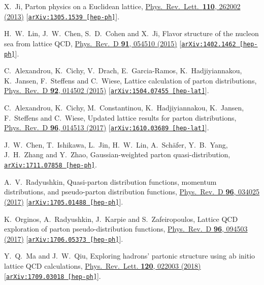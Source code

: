 \documentclass[aps,prl,reprint,groupedaddress, preprintnumbers]{revtex4-1}
\begin{document}
\begin{thebibliography}{50}
  
  X.~Ji,
  Parton physics on a Euclidean lattice,
  \href{https://doi.org/10.1103/PhysRevLett.110.262002}{Phys.\ Rev.\ Lett.\  {\bf 110}, 262002 (2013)}
  [\href{https://arxiv.org/abs/1305.1539}{\tt arXiv:1305.1539 [hep-ph]}].
  
  
  H.~W.~Lin, J.~W.~Chen, S.~D.~Cohen and X.~Ji,
  Flavor structure of the nucleon sea from lattice QCD,
  \href{https://doi.org/10.1103/PhysRevD.91.054510}{Phys.\ Rev.\ D {\bf 91}, 054510 (2015)}
  [\href{https://arxiv.org/abs/1402.1462}{\tt arXiv:1402.1462 [hep-ph]}].
  
  
  C.~Alexandrou, K.~Cichy, V.~Drach, E.~Garcia-Ramos, K.~Hadjiyiannakou, K.~Jansen, F.~Steffens and C.~Wiese,
  Lattice calculation of parton distributions,
  \href{https://doi.org/10.1103/PhysRevD.92.014502}{Phys.\ Rev.\ D {\bf 92}, 014502 (2015)}
  [\href{https://arxiv.org/abs/1504.07455}{\tt arXiv:1504.07455 [hep-lat]}].
  
  
  C.~Alexandrou, K.~Cichy, M.~Constantinou, K.~Hadjiyiannakou, K.~Jansen, F.~Steffens and C.~Wiese,
  Updated lattice results for parton distributions,
  \href{https://doi.org/10.1103/PhysRevD.96.014513}{Phys.\ Rev.\ D {\bf 96}, 014513 (2017)}
  [\href{https://arxiv.org/abs/1610.03689}{\tt arXiv:1610.03689 [hep-lat]}].
  

  J.~W.~Chen, T.~Ishikawa, L.~Jin, H.~W.~Lin, A.~Sch\"afer, Y.~B.~Yang, J.~H.~Zhang and Y.~Zhao,
  Gaussian-weighted parton quasi-distribution,
  \href{https://arxiv.org/abs/1711.07858}{\tt arXiv:1711.07858 [hep-ph]}.
  
 
  A.~V.~Radyushkin,
  Quasi-parton distribution functions, momentum distributions, and pseudo-parton distribution functions,
  \href{https://doi.org/10.1103/PhysRevD.96.034025}{Phys.\ Rev.\ D {\bf 96},  034025 (2017)}
  [\href{https://arxiv.org/abs/1705.01488}{\tt arXiv:1705.01488 [hep-ph]}].
  
  
  K.~Orginos, A.~Radyushkin, J.~Karpie and S.~Zafeiropoulos,
  Lattice QCD exploration of parton pseudo-distribution functions,
  \href{https://doi.org/10.1103/PhysRevD.96.094503}{Phys.\ Rev.\ D {\bf 96},  094503 (2017)}
  [\href{https://arxiv.org/abs/1706.05373}{\tt arXiv:1706.05373 [hep-ph]}].
  
  
  Y.~Q.~Ma and J.~W.~Qiu,
  Exploring hadrons' partonic structure using ab initio lattice QCD calculations,
  \href{https://doi.org/10.1103/PhysRevLett.120.022003}{Phys.\ Rev.\ Lett. {\bf 120}, 022003 (2018)}
  [\href{https://arxiv.org/abs/1709.03018}{\tt arXiv:1709.03018 [hep-ph]}].
  

\end{thebibliography}
\end{document}
